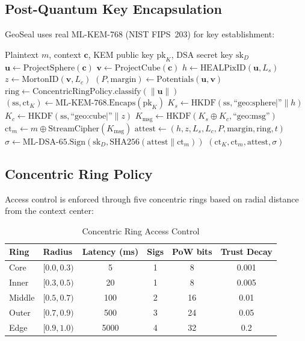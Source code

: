 \documentclass[11pt,a4paper]{article}
\newcommand{\norm}[1]{\left\|#1\right\|}
\begin{document}
\subsection{Post-Quantum Key Encapsulation}

GeoSeal uses real ML-KEM-768 (NIST FIPS~203) for key establishment:

\begin{algorithm}
\caption{GeoSeal Encrypt}
\label{alg:geoseal-enc}
\begin{algorithmic}[1]
\Require Plaintext $m$, context $\mathbf{c}$, KEM public key $\text{pk}_K$, DSA secret key $\text{sk}_D$
\State $\mathbf{u} \gets \text{ProjectSphere}(\mathbf{c})$ 
\State $\mathbf{v} \gets \text{ProjectCube}(\mathbf{c})$ 
\State $h \gets \text{HEALPixID}(\mathbf{u}, L_s)$
\State $z \gets \text{MortonID}(\mathbf{v}, L_c)$
\State $(P, \text{margin}) \gets \text{Potentials}(\mathbf{u}, \mathbf{v})$
\State $\text{ring} \gets \text{ConcentricRingPolicy.classify}(\norm{\mathbf{u}})$
\State $(\text{ss}, \text{ct}_K) \gets \text{ML-KEM-768.Encaps}(\text{pk}_K)$
\State $K_s \gets \text{HKDF}(\text{ss}, \text{``geo:sphere|''} \| h)$
\State $K_c \gets \text{HKDF}(\text{ss}, \text{``geo:cube|''} \| z)$
\State $K_{\text{msg}} \gets \text{HKDF}(K_s \oplus K_c, \text{``geo:msg''})$
\State $\text{ct}_m \gets m \oplus \text{StreamCipher}(K_{\text{msg}})$
\State $\text{attest} \gets (h, z, L_s, L_c, P, \text{margin}, \text{ring}, t)$
\State $\sigma \gets \text{ML-DSA-65.Sign}(\text{sk}_D, \text{SHA256}(\text{attest} \| \text{ct}_m))$
\State \Return $(\text{ct}_K, \text{ct}_m, \text{attest}, \sigma)$
\end{algorithmic}
\end{algorithm}

\subsection{Concentric Ring Policy}

Access control is enforced through five concentric rings based on
radial distance from the context center:

\begin{table}[h]
\centering
\caption{Concentric Ring Access Control}
\label{tab:rings}
\begin{tabular}{@{}llcccc@{}}
\toprule
\textbf{Ring} & \textbf{Radius} & \textbf{Latency (ms)} & \textbf{Sigs} & \textbf{PoW bits} & \textbf{Trust Decay} \\
\midrule
Core   & $[0.0, 0.3)$ & 5    & 1 & 8  & 0.001 \\
Inner  & $[0.3, 0.5)$ & 20   & 1 & 8  & 0.005 \\
Middle & $[0.5, 0.7)$ & 100  & 2 & 16 & 0.01 \\
Outer  & $[0.7, 0.9)$ & 500  & 3 & 24 & 0.05 \\
Edge   & $[0.9, 1.0)$ & 5000 & 4 & 32 & 0.2 \\
\bottomrule
\end{tabular}
\end{table}
\end{document}
